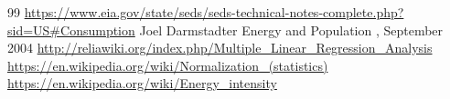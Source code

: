 \documentclass{mcmthesis}
\begin{document}
\begin{thebibliography} {99}
  \url{https://www.eia.gov/state/seds/seds-technical-notes-complete.php?sid=US#Consumption}
   Joel Darmstadter    Energy and Population , September 2004
  \url{http://reliawiki.org/index.php/Multiple_Linear_Regression_Analysis}
  \url{https://en.wikipedia.org/wiki/Normalization_(statistics)}
  \url{https://en.wikipedia.org/wiki/Energy_intensity}
\end{thebibliography}
\end{document}
